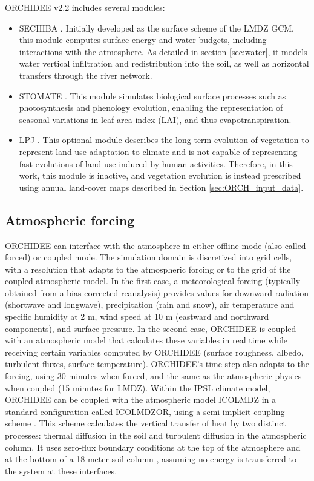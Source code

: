 ORCHIDEE v2.2 includes several modules:
\begin{itemize}
    \item SECHIBA \citep[\textit{Schématisation des Échanges Hydriques à l’Interface entre la Biosphère et l’Atmo\-sphère}][]{ducoudre_sechiba_1993}. Initially developed as the surface scheme of the LMDZ GCM, this module computes surface energy and water budgets, including interactions with the atmosphere. As detailed in section \ref{sec:water}, it models water vertical infiltration and redistribution into the soil, as well as horizontal transfers through the river network.
    \item STOMATE \citep{krinner_dynamic_2005}. This module simulates biological surface processes such as photosynthesis and phenology evolution, enabling the representation of seasonal variations in leaf area index (LAI), and thus evapotranspiration.
    \item LPJ \citep{sitch_evaluation_2003}. This optional module describes the long-term evolution of vegetation to represent land use adaptation to climate and is not capable of representing fast evolutions of land use induced by human activities. Therefore, in this work, this module is inactive, and vegetation evolution is instead prescribed using annual land-cover maps described in Section \ref{sec:ORCH_input_data}.
\end{itemize}

\subsection{Atmospheric forcing}
ORCHIDEE can interface with the atmosphere in either offline mode (also called forced) or coupled mode. The simulation domain is discretized into grid cells, with a resolution that adapts to the atmospheric forcing or to the grid of the coupled atmospheric model.
In the first case, a meteorological forcing (typically obtained from a bias-corrected reanalysis) provides values for downward radiation (shortwave and longwave), precipitation (rain and snow), air temperature and specific humidity at 2 m, wind speed at 10 m (eastward and northward components), and surface pressure. 
In the second case, ORCHIDEE is coupled with an atmospheric model that calculates these variables in real time while receiving certain variables computed by ORCHIDEE (surface roughness, albedo, turbulent fluxes, surface temperature). ORCHIDEE's time step also adapts to the forcing, using 30 minutes when forced, and the same as the atmospheric physics when coupled (15 minutes for LMDZ).
Within the IPSL climate model, ORCHIDEE can be coupled with the atmospheric model ICOLMDZ in a standard configuration called ICOLMDZOR, using a semi-implicit coupling scheme \citep{polcher_proposal_1998, Hourdin_phdthesis,hourdin_parameterization_2002}. This scheme calculates the vertical transfer of heat by two distinct processes: thermal diffusion in the soil and turbulent diffusion in the atmospheric column. It uses zero-flux boundary conditions at the top of the atmosphere and at the bottom of a 18-meter soil column \citep{dufresne2009description}, assuming no energy is transferred to the system at these interfaces.


